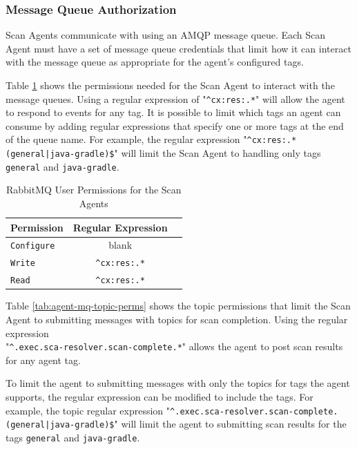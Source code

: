 \subsubsection{Message Queue Authorization}\label{sec:agent-mq-auth-req}

Scan Agents communicate with \cxoneflow using an AMQP message queue. Each Scan Agent 
must have a set of message queue credentials that limit how it can interact
with the message queue as appropriate for the agent's configured tags.

Table \ref{tab:agent-mq-user-perms} shows the permissions needed for the Scan Agent
to interact with the message queues.  Using a regular expression of "\texttt{\^{}cx:res:.*}" will allow
the agent to respond to events for any tag.  It is possible to limit which tags an agent can consume
by adding regular expressions that specify one or more tags at the end of the queue name.  For example, the
regular expression "\texttt{\^{}cx:res:.*(general|java-gradle)\$}" will limit the Scan Agent
to handling only tags \texttt{general} and \texttt{java-gradle}.

\begin{table}[ht]
  \caption{RabbitMQ User Permissions for the Scan Agents}
  \label{tab:agent-mq-user-perms}      
  \begin{tabularx}{\textwidth}{lcl}
      \toprule
      \textbf{Permission} & \textbf{Regular Expression} \\
      \midrule
      \texttt{Configure} & blank \\
      \midrule
      \texttt{Write} & \texttt{\^{}cx:res:.*} \\
      \midrule
      \texttt{Read} & \texttt{\^{}cx:res:.*} \\
      \midrule
      \bottomrule
  \end{tabularx}
\end{table}

Table \ref{tab:agent-mq-topic-perms} shows the topic permissions that limit the Scan Agent
to submitting messages with topics for scan completion.  Using the regular expression\\"\texttt{\^{}.exec.sca-resolver.scan-complete.*}"
allows the agent to post scan results for any agent tag.

To limit the agent to submitting messages with only the topics for tags the agent supports, the regular expression can
be modified to include the tags.  For example, the topic regular expression
"\texttt{\^{}.exec.sca-resolver.scan-complete.(general|java-gradle)\$}" will limit the agent to submitting
scan results for the tags \texttt{general} and \texttt{java-gradle}.

